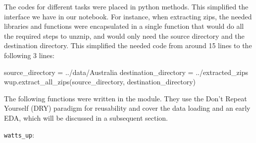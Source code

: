 \documentclass[
]{article}
\newenvironment{Shaded}{}{}
\newcommand{\NormalTok}[1]{#1}
\newcommand{\OperatorTok}[1]{\textcolor[rgb]{0.40,0.40,0.40}{#1}}
\newcommand{\StringTok}[1]{\textcolor[rgb]{0.25,0.44,0.63}{#1}}
\begin{document}
The codes for different tasks were placed in python methods. This
simplified the interface we have in our notebook. For instance, when
extracting zips, the needed libraries and functions were encapsulated in
a single function that would do all the required steps to unznip, and
would only need the source directory and the destination directory. This
simplified the needed code from around 15 lines to the following 3
lines:

\begin{Shaded}
\begin{Highlighting}[]
\NormalTok{source\_directory }\OperatorTok{=} \StringTok{\textquotesingle{}../data/Australia\textquotesingle{}}
\NormalTok{destination\_directory }\OperatorTok{=} \StringTok{\textquotesingle{}../extracted\_zips\textquotesingle{}}
\NormalTok{wup.extract\_all\_zips(source\_directory, destination\_directory)}
\end{Highlighting}
\end{Shaded}

The following functions were written in the module. They use the Don't
Repeat Yourself (DRY) paradigm for reusability and cover the data
loading and an early EDA, which will be discussed in a subsequent
section.

\texttt{watts\_up}:
\end{document}

